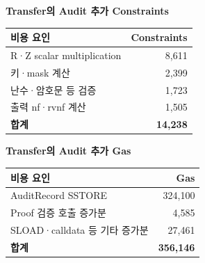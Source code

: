 \par\medskip\noindent\begin{minipage}{\linewidth}
    \begin{minipage}[t]{0.48\linewidth}
        \centering\small
        \textbf{Transfer의 Audit 추가 Constraints}\par\smallskip
        \begin{tabular}{@{}lr@{}}\toprule
            \textbf{비용 요인}            & \textbf{Constraints} \\
            \midrule
            R·Z scalar multiplication & 8,611                \\
            키·mask 계산                 & 2,399                \\
            난수·암호문 등 검증               & 1,723                \\
            출력 nf·rvnf 계산             & 1,505                \\
            \midrule
            \textbf{합계}               & \textbf{14,238}      \\
            \bottomrule
        \end{tabular}
    \end{minipage}\hfill
    \begin{minipage}[t]{0.48\linewidth}
        \centering\small
        \textbf{Transfer의 Audit 추가 Gas}\par\smallskip
        \begin{tabular}{@{}lr@{}}\toprule
            \textbf{비용 요인}          & \textbf{Gas}     \\
            \midrule
            AuditRecord SSTORE      & 324,100          \\
            Proof 검증 호출 증가분         & 4,585            \\
            SLOAD·calldata 등 기타 증가분 & 27,461           \\
            \midrule
            \textbf{합계}             & \textbf{356,146} \\
            \bottomrule
        \end{tabular}
    \end{minipage}
\end{minipage}\par\medskip
